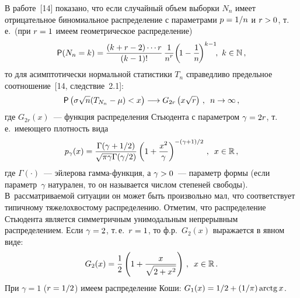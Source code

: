 \begin{multicols}{2}
В работе~[14] показано, что если случайный объем выборки $N_n$ имеет
отрицательное биномиальное распределение с параметрами  $p\hm=1/n$ и
$r\hm>0$,  т.\,е.\ (при $r\hm=1$ имеем гео\-мет\-ри\-че\-ское распределение)
$$
{\sf P}(N_n=k)=\displaystyle\frac{\displaystyle (k+r-2)\cdots r\mathstrut}{\displaystyle (k-1)!\mathstrut}\,\displaystyle\frac{\displaystyle 1\mathstrut}{\displaystyle n^r\mathstrut}\!\left(\!1
-\displaystyle\frac{\displaystyle 1\mathstrut}{\displaystyle n\mathstrut}\!\right)^{k-1}\!\!,\ k\in\mathbb N\,,
$$
то для асимптотически нормальной статистики $T_n$ справедливо
предельное соотношение~[14, следствие~2.1]:
\begin{equation*}
{\sf P}\left(\sigma\sqrt{n}(T_{N_n} - \mu) < x\right)\longrightarrow
G_{2r}\left(x\sqrt r\right)\,,\enskip n\to\infty\,, 
\end{equation*}
где  $G_{2r}(x)$~--- функция распределения Стьюдента с параметром
$\gamma\hm=2r$, т.\,е.\ имеющего плотность вида
$$
p_{\gamma}(x)=\displaystyle\frac{\displaystyle \Gamma(\gamma+1/2)\mathstrut}{\displaystyle \sqrt{\pi\gamma}
\Gamma(\gamma/2)\mathstrut}\left( 1+\displaystyle\frac{\displaystyle x^2\mathstrut}{\displaystyle \gamma\mathstrut}\right)^{-(\gamma+1)/2}\,,
\enskip x\in\mathbb{R}\,,
$$
где  $\Gamma(\cdot)$~--- эйлерова гам\-ма-функ\-ция, а  $\gamma\hm>0$~---
параметр формы (если параметр~$\gamma$ натурален, то он называется
числом степеней свободы). В~рас\-смат\-ри\-ва\-емой ситуации он может быть
произвольно мал, что соответствует типичному тяжелохвостому
распределению. Отметим, что распределение Стьюдента является
симметричным унимодальным непрерывным распределением. Если
$\gamma\hm=2$, т.\,е.\ $r\hm=1$, то ф.р.~$G_2(x)$ выражается в явном виде:
$$
G_2(x) = \displaystyle\frac{\displaystyle 1\mathstrut}{\displaystyle 2\mathstrut}\left( 1+\displaystyle\frac{\displaystyle x\mathstrut}{\displaystyle \sqrt{2+x^2}\mathstrut} \right)\,,\enskip x\in\mathbb{R}\,.
$$
При $\gamma=1$ ($r\hm=1/2$) имеем распределение Коши:
$G_1(x)\hm=1/2\hm+(1/\pi)\arctg x$.


\end{multicols}

